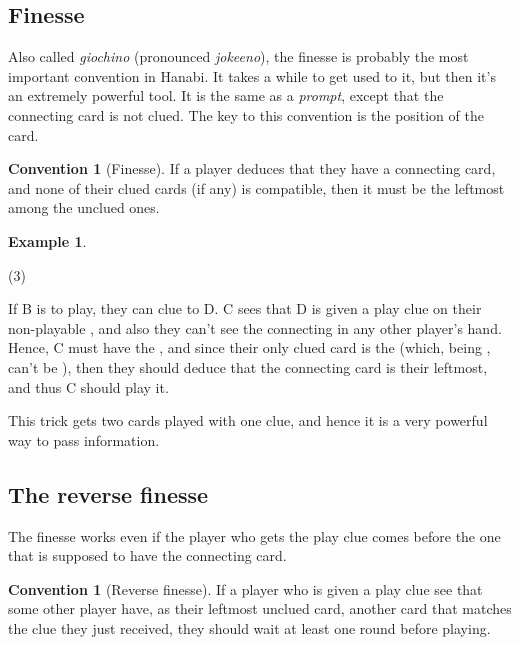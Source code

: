 \documentclass[a4paper]{article}
\theoremstyle{plain}
\theoremstyle{definition}
\newtheorem{example}[theorem]{Example}
\newtheorem{convention}[theorem]{Convention}
\begin{document}
\subsection{Finesse}
\label{sec:finesse}

Also called \textit{giochino} (pronounced \textit{jokeeno}), the finesse is probably the most important convention in Hanabi. It takes a while to get used to it, but then it's an extremely powerful tool. It is the same as a \textit{prompt}, except that the connecting card is not clued. The key to this convention is the position of the card.

\begin{convention}[Finesse]
	\label{finesse}
	If a player deduces that they have a connecting card, and none of their clued cards (if any) is compatible, then it must be the leftmost among the unclued ones.
\end{convention}

\begin{example}
	\hfill
	\begin{tasks}(3)
		\task[+]      
		\task[A]    
		\task[B]    
		\task[C]    
		\task[D]    
		\task[E]    
	\end{tasks}
	
	If B is to play, they can clue  to D. C sees that D is given a play clue on their non-playable , and also they can't see the connecting  in any other player's hand. Hence, C must have the , and since their only clued card is the  (which, being , can't be ), then they should deduce that the connecting card is their leftmost, and thus C should play it.
\end{example}

This trick gets two cards played with one clue, and hence it is a very powerful way to pass information.

\subsection{The reverse finesse}

The finesse works even if the player who gets the play clue comes before the one that is supposed to have the connecting card. 

\begin{convention}[Reverse finesse]
	If a player who is given a play clue see that some other player have, as their leftmost unclued card, another card that matches the clue they just received, they should wait at least one round before playing.
\end{convention}
\end{document}
